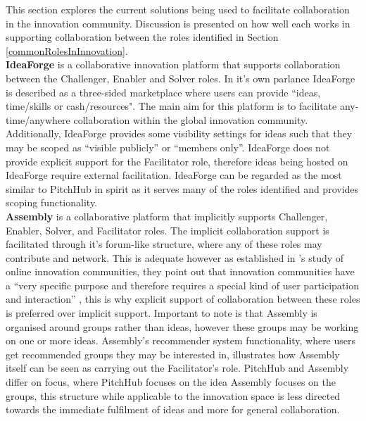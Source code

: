 This section explores the current solutions being used to facilitate collaboration in the innovation community. Discussion is presented on how well each works in supporting collaboration between the roles identified in Section \ref{commonRolesInInnovation}.
\\
\newline
\textbf{IdeaForge} \cite{ideaForge:online}
is a collaborative innovation platform that supports collaboration between the Challenger, Enabler and Solver roles. In it's own parlance IdeaForge is described as a three-sided marketplace where users can provide ``ideas, time/skills or cash/resources". The main aim for this platform is to facilitate any-time/anywhere collaboration within the global innovation community. Additionally, IdeaForge provides some visibility settings for ideas such that they may be scoped as ``visible publicly'' or ``members only''. IdeaForge does not provide explicit support for the Facilitator role, therefore ideas being hosted on IdeaForge require external facilitation. IdeaForge can be regarded as the most similar to PitchHub in spirit as it serves many of the roles identified and provides scoping functionality.
\\
\newline
\textbf{Assembly} \cite{assembly:online}
is a collaborative platform that implicitly supports Challenger, Enabler, Solver, and Facilitator roles. The implicit collaboration support is facilitated through it's forum-like structure, where any of these roles may contribute and network. This is adequate however as established in \citeauthor{hautz2010establish}'s study of online innovation communities, they point out that innovation communities have a ``very specific purpose and therefore requires a special kind of user participation and interaction'' \cite{hautz2010establish}, this is why explicit support of collaboration between these roles is preferred over implicit support. Important to note is that Assembly is organised around groups rather than ideas, however these groups may be working on one or more ideas. Assembly's recommender system functionality, where users get recommended groups they may be interested in, illustrates how Assembly itself can be seen as carrying out the Facilitator's role. PitchHub and Assembly differ on focus, where PitchHub focuses on the idea Assembly focuses on the groups, this structure while applicable to the innovation space is less directed towards the immediate fulfilment of ideas and more for general collaboration.
\\
